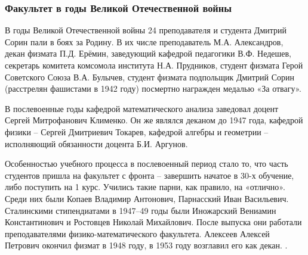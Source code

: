 \documentclass[pdf,hyperref={unicode}, aspectratio=43, serif,11pt]{beamer}
\begin{document}
\begin{frame}
\frametitle{Факультет в годы Великой Отечественной войны}
\tiny{
В годы Великой Отечественной войны 24 преподавателя и студента Дмитрий Сорин пали в боях за Родину. В их числе преподаватель М.А. Александров, декан физмата П.Д. Ерёмин, заведующий кафедрой педагогики В.Ф. Недешев, секретарь комитета комсомола института Н.А. Прудников, студент физмата Герой Советского Союза В.А. Булычев, студент физмата подпольщик Дмитрий Сорин (расстрелян фашистами в 1942 году) посмертно награжден медалью «За отвагу».

В послевоенные годы кафедрой математического анализа заведовал доцент Сергей Митрофанович Клименко. Он же являлся деканом до 1947 года, кафедрой физики – Сергей Дмитриевич Токарев, кафедрой алгебры и геометрии – исполняющий обязанности доцента Б.И. Аргунов.

Особенностью учебного процесса в послевоенный период стало то, что часть студентов пришла на факультет с фронта – завершить начатое в 30-х обучение, либо поступить на 1 курс. Учились такие парни, как правило, на «отлично». Среди них были Копаев Владимир Антонович, Парнасский Иван Васильевич. Сталинскими стипендиатами в 1947–49 годы были Иножарский Вениамин Константинович и Ростовцев Николай Михайлович. После выпуска они работали преподавателями физико-математического факультета. Алексеев Алексей Петрович окончил физмат в 1948 году, в 1953 году возглавил его как декан.
.}
\begin{figure}[!h]
\centering
{}
\end{figure}

\end{frame}
\end{document}
